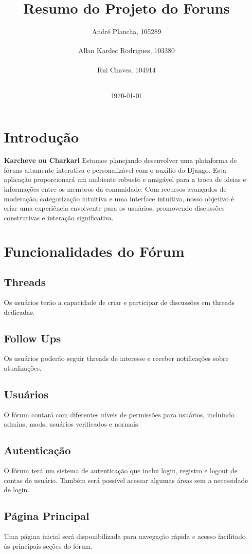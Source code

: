 \documentclass{article}
\title{Resumo do Projeto do Foruns}
\author{
  André Plancha, 105289 \\
  \email{Andre\_Plancha@iscte-iul.pt}\\
  Allan Kardec Rodrigues, 103380 \\
  \email{aksrs@iscte-iul.pt} \\
  Rui Chaves, 104914 \\
  \email{rfpcs1@iscte.pt}\\
  \vspace{30pt}
}
\date{\today}
\begin{document}
  \thispagestyle{empty}
  \pagebreak
  \section{Introdução}
  \textbf{Karcheve ou Charkarl} Estamos planejando desenvolver uma plataforma de fóruns altamente interativa e personalizável com o auxílio do Django. Esta aplicação proporcionará um ambiente robusto e amigável para a troca de ideias e informações entre os membros da comunidade. Com recursos avançados de moderação, categorização intuitiva e uma interface intuitiva, nosso objetivo é criar uma experiência envolvente para os usuários, promovendo discussões construtivas e interação significativa.
  \pagebreak
  \section{Funcionalidades do Fórum}
  
  \subsection{Threads}
  Os usuários terão a capacidade de criar e participar de discussões em threads dedicadas.
  
  \subsection{Follow Ups}
  Os usuários poderão seguir threads de interesse e receber notificações sobre atualizações.
  
  \subsection{Usuários}
  O fórum contará com diferentes níveis de permissões para usuários, incluindo admins, mods, usuários verificados e normais.
  
  \subsection{Autenticação}
  O fórum terá um sistema de autenticação que inclui login, registro e logout de contas de usuário. Também será possível acessar algumas áreas sem a necessidade de login.
  
  \subsection{Página Principal}
  Uma página inicial será disponibilizada para navegação rápida e acesso facilitado às principais seções do fórum.
  
\end{document}
